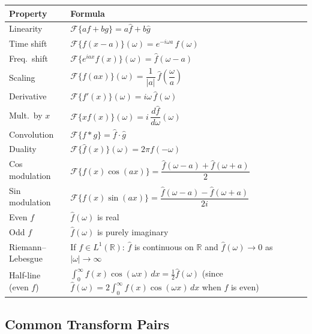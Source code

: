 \documentclass[12pt, a4paper]{article}
\theoremstyle{definition}
\theoremstyle{remark}
\begin{document}
\begin{center}
\begin{tabular}{ll}
\toprule
\textbf{Property} & \textbf{Formula} \\
\midrule
Linearity          & $\mathcal{F}\{af+bg\} = a\hat{f}+b\hat{g}$ \\[4pt]
Time shift         & $\mathcal{F}\{f(x-a)\}(\omega) = e^{-i\omega a}\,\hat{f}(\omega)$ \\[4pt]
Freq.\ shift       & $\mathcal{F}\{e^{iax}f(x)\}(\omega) = \hat{f}(\omega - a)$ \\[4pt]
Scaling            & $\mathcal{F}\{f(ax)\}(\omega) = \dfrac{1}{|a|}\,\hat{f}\!\left(\dfrac{\omega}{a}\right)$ \\[4pt]
Derivative         & $\mathcal{F}\{f'(x)\}(\omega) = i\omega\,\hat{f}(\omega)$ \\[4pt]
Mult.\ by $x$      & $\mathcal{F}\{xf(x)\}(\omega) = i\,\dfrac{d\hat{f}}{d\omega}(\omega)$ \\[4pt]
Convolution        & $\mathcal{F}\{f*g\} = \hat{f}\cdot\hat{g}$ \\[4pt]
Duality            & $\mathcal{F}\{\hat{f}(x)\}(\omega) = 2\pi f(-\omega)$ \\[4pt]
Cos modulation     & $\mathcal{F}\{f(x)\cos(ax)\} = \dfrac{\hat{f}(\omega-a)+\hat{f}(\omega+a)}{2}$ \\[4pt]
Sin modulation     & $\mathcal{F}\{f(x)\sin(ax)\} = \dfrac{\hat{f}(\omega-a)-\hat{f}(\omega+a)}{2i}$ \\[4pt]
Even $f$           & $\hat{f}(\omega)$ is real \\[2pt]
Odd $f$            & $\hat{f}(\omega)$ is purely imaginary \\[4pt]
Riemann--Lebesgue  & If $f\in L^1(\mathbb{R})$: $\hat{f}$ is continuous on $\mathbb{R}$ and $\hat{f}(\omega)\to 0$ as $|\omega|\to\infty$ \\[4pt]
Half-line (even $f$) & $\displaystyle\int_0^\infty f(x)\cos(\omega x)\,dx = \tfrac{1}{2}\hat{f}(\omega)$
                       \quad (since $\hat{f}(\omega) = 2\int_0^\infty f(x)\cos(\omega x)\,dx$ when $f$ is even) \\
\bottomrule
\end{tabular}
\end{center}

\subsection{Common Transform Pairs}
\end{document}
